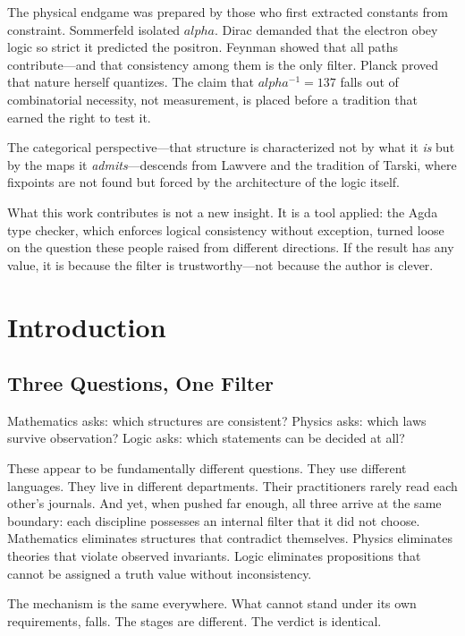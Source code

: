 \documentclass[11pt,a4paper]{book}
\def\alpha{alpha}%
\begin{document}
The physical endgame was prepared by those who first extracted constants from constraint. Sommerfeld isolated $\alpha$. Dirac demanded that the electron obey logic so strict it predicted the positron. Feynman showed that all paths contribute—and that consistency among them is the only filter. Planck proved that nature herself quantizes. The claim that $\alpha^{-1} = 137$ falls out of combinatorial necessity, not measurement, is placed before a tradition that earned the right to test it.

The categorical perspective—that structure is characterized not by what it \emph{is} but by the maps it \emph{admits}—descends from Lawvere and the tradition of Tarski, where fixpoints are not found but forced by the architecture of the logic itself.

What this work contributes is not a new insight. It is a tool applied: the Agda type checker, which enforces logical consistency without exception, turned loose on the question these people raised from different directions. If the result has any value, it is because the filter is trustworthy—not because the author is clever.

\mainmatter

\chapter{Introduction}

\section{Three Questions, One Filter}

Mathematics asks: which structures are consistent?
Physics asks: which laws survive observation?
Logic asks: which statements can be decided at all?

These appear to be fundamentally different questions. They use different languages. They live in different departments. Their practitioners rarely read each other's journals. And yet, when pushed far enough, all three arrive at the same boundary: each discipline possesses an internal filter that it did not choose. Mathematics eliminates structures that contradict themselves. Physics eliminates theories that violate observed invariants. Logic eliminates propositions that cannot be assigned a truth value without inconsistency.

The mechanism is the same everywhere. What cannot stand under its own requirements, falls. The stages are different. The verdict is identical.
\end{document}
